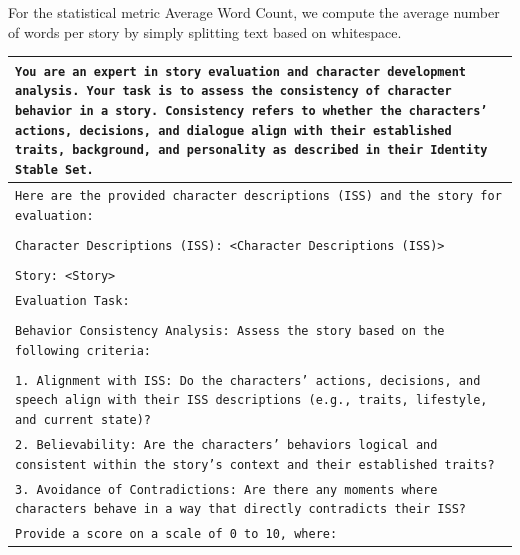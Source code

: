 \documentclass[letterpaper]{article} %
\begin{document}
For the statistical metric Average Word Count, we compute the average number of words per story by simply splitting text based on whitespace.

\begin{table}[]
  \small
  \centering
  \begin{tabularx}{\textwidth}{X}
    \toprule
    \texttt{You are an expert in story evaluation and character development analysis. Your task is to assess the consistency of character behavior in a story. Consistency refers to whether the characters' actions, decisions, and dialogue align with their established traits, background, and personality as described in their Identity Stable Set.} \\

    \midrule

    \texttt{Here are the provided character descriptions (ISS) and the story for evaluation:} \\\\

    \texttt{Character Descriptions (ISS): <Character Descriptions (ISS)>} \\\\

    \texttt{Story: <Story>} \\

    \midrule

    \texttt{Evaluation Task:} \\\\

    \texttt{Behavior Consistency Analysis: Assess the story based on the following criteria:} \\\\

    \texttt{1. Alignment with ISS: Do the characters' actions, decisions, and speech align with their ISS descriptions (e.g., traits, lifestyle, and current state)?} \\

    \texttt{2. Believability: Are the characters' behaviors logical and consistent within the story's context and their established traits?} \\

    \texttt{3. Avoidance of Contradictions: Are there any moments where characters behave in a way that directly contradicts their ISS?} \\

    \midrule

    \texttt{Provide a score on a scale of 0 to 10, where:} \\


\end{tabularx}
\end{table}
\end{document}
